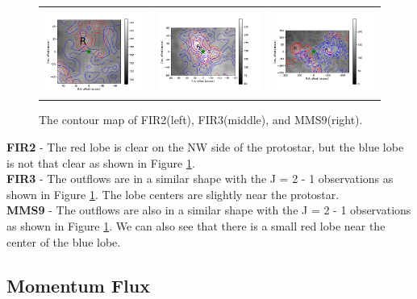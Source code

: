 \begin{figure}[h!]
	\begin{tabular}{ccc}
		\includegraphics[width = 5cm]{Orion_12CO_NRO_HOPS68_rbcontour_400.png} & \includegraphics[width = 5cm]{Orion_12CO_NRO_HOPS370_rbcontour_400.png} & \includegraphics[width = 5cm]{Orion_12CO_NRO_HOPS78_rbcontour_400.png}
		\label{10}
	\end{tabular}
	\caption{The contour map of FIR2(left), FIR3(middle), and MMS9(right). }
\end{figure}
 
 
\noindent \textbf{FIR2} - The red lobe is clear on the NW side of the protostar, but the blue lobe is not that clear as shown in Figure \ref{10}.\\
\textbf{FIR3} - The outflows are in a similar shape with the J = 2 - 1 observations as shown in Figure \ref{10}. The lobe centers are slightly near the protostar.\\
\textbf{MMS9} - The outflows are also in a similar shape with the J = 2 - 1 observations as shown in Figure \ref{10}. We can also see that there is a small red lobe near the center of the blue lobe.\\
\newpage

\subsection{Momentum Flux}


